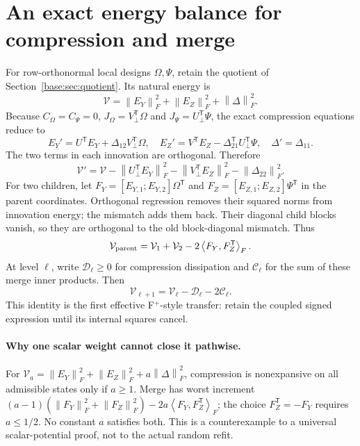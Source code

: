 \documentclass[11pt,oneside,openany,a4paper]{book}
\numberwithin{equation}{chapter}
\theoremstyle{definition}
\theoremstyle{remark}
\newcommand{\T}{\mathsf T}\newcommand{\Id}{I}
\newcommand{\F}[1]{\left\lVert#1\right\rVert_F}
\newcommand{\ip}[2]{\left\langle#1,#2\right\rangle_F}
\begin{document}
\section{An exact energy balance for compression and merge}\label{base:new:energy}
For row-orthonormal local designs $\Omega,\Psi$, retain the quotient of Section~\ref{base:sec:quotient}. Its natural energy is
\[
 \mathcal V=\F{E_Y}^2+\F{E_Z}^2+\F\Delta^2.
\]
Because $C_\Omega=C_\Psi=0$, $J_\Omega=V_\perp^\T\Omega$ and $J_\Psi=U_\perp^\T\Psi$, the exact compression equations reduce to
\[
 E_Y'=U^\T E_Y+\Delta_{12}V_\perp^\T\Omega,\quad
 E_Z'=V^\T E_Z-\Delta_{21}^\T U_\perp^\T\Psi,\quad
 \Delta'=\Delta_{11}.
\]
The two terms in each innovation are orthogonal. Therefore
\begin{equation}\label{base:new:Vcomp}
 \mathcal V'=\mathcal V-\F{U_\perp^\T E_Y}^2-\F{V_\perp^\T E_Z}^2-\F{\Delta_{22}}^2.
\end{equation}
For two children, let $F_Y=[E_{Y,1};E_{Y,2}]\Omega^\T$ and $F_Z=[E_{Z,1};E_{Z,2}]\Psi^\T$ in the parent coordinates. Orthogonal regression removes their squared norms from innovation energy; the mismatch adds them back. Their diagonal child blocks vanish, so they are orthogonal to the old block-diagonal mismatch. Thus
\begin{equation}\label{base:new:Vmerge}
 \mathcal V_{\rm parent}=\mathcal V_1+\mathcal V_2-2\ip{F_Y}{F_Z^\T}.
\end{equation}
At level $\ell$, write $\mathcal D_\ell\ge0$ for compression dissipation and $\mathcal C_\ell$ for the sum of these merge inner products. Then
\begin{equation}\label{base:new:Vlevel}
 \mathcal V_{\ell+1}=\mathcal V_\ell-\mathcal D_\ell-2\mathcal C_\ell.
\end{equation}
This identity is the first effective F$^+$-style transfer: retain the coupled signed expression until its internal squares cancel.

\paragraph{Why one scalar weight cannot close it pathwise.}
For $\mathcal V_a=\F{E_Y}^2+\F{E_Z}^2+a\F\Delta^2$, compression is nonexpansive on all admissible states only if $a\ge1$. Merge has worst increment $(a-1)(\F{F_Y}^2+\F{F_Z}^2)-2a\ip{F_Y}{F_Z^\T}$; the choice $F_Z^\T=-F_Y$ requires $a\le1/2$. No constant $a$ satisfies both. This is a counterexample to a universal scalar-potential proof, not to the actual random refit.
\end{document}
